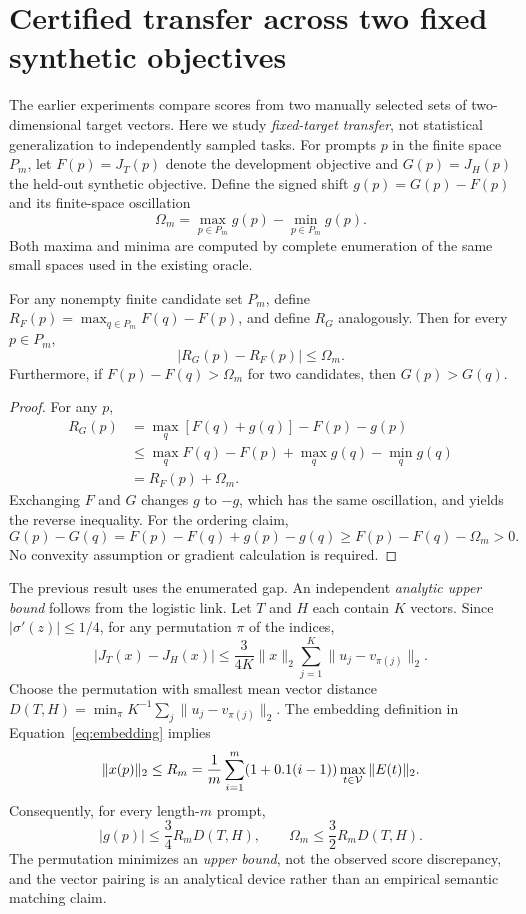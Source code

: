 \section{Certified transfer across two fixed synthetic objectives}
\label{sec:target-transfer}
The earlier experiments compare scores from two manually selected sets of
two-dimensional target vectors. Here we study \emph{fixed-target transfer},
not statistical generalization to independently sampled tasks. For
prompts $p$ in the finite space $P_m$, let $F(p)=J_T(p)$ denote the
development objective and $G(p)=J_H(p)$ the held-out synthetic objective.
Define the signed shift $g(p)=G(p)-F(p)$ and its finite-space oscillation
\[
\Omega_m=\max_{p\in P_m}g(p)-\min_{p\in P_m}g(p).
\]
Both maxima and minima are computed by complete enumeration of the same
small spaces used in the existing oracle.

\begin{proposition}
\label{prop:target-transfer}
For any nonempty finite candidate set $P_m$, define
$R_F(p)=\max_{q\in P_m}F(q)-F(p)$, and define $R_G$ analogously.
Then for every $p\in P_m$,
\begin{equation}
 |R_G(p)-R_F(p)|\leq\Omega_m.
 \label{eq:regret-transfer}
\end{equation}
Furthermore, if $F(p)-F(q)>\Omega_m$ for two candidates, then $G(p)>G(q)$.
\end{proposition}
\begin{proof}
For any $p$,
\[
\begin{split}
R_G(p)
 &=\max_q[F(q)+g(q)]-F(p)-g(p)\\
 &\leq \max_qF(q)-F(p)+\max_qg(q)-\min_qg(q)\\
 &= R_F(p)+\Omega_m.
\end{split}
\]
Exchanging $F$ and $G$ changes $g$ to $-g$, which has the same
oscillation, and yields the reverse inequality. For the ordering claim,
\[
 G(p)-G(q)
 =F(p)-F(q)+g(p)-g(q)
 \geq F(p)-F(q)-\Omega_m>0.
\]
No convexity assumption or gradient calculation is required.
\end{proof}

The previous result uses the enumerated gap. An independent
\emph{analytic upper bound} follows from the logistic link. Let $T$
and $H$ each contain $K$ vectors. Since
$|\sigma'(z)|\leq1/4$, for any permutation $\pi$ of the indices,
\[
 |J_T(x)-J_H(x)|
 \leq\frac{3}{4K}\|x\|_2
       \sum_{j=1}^K\|u_j-v_{\pi(j)}\|_2.
\]
Choose the permutation with smallest mean vector distance
$D(T,H)=\min_\pi K^{-1}\sum_j\|u_j-v_{\pi(j)}\|_2$.
The embedding definition in Equation~\eqref{eq:embedding} implies
\[
 \|x(p)\|_2\leq
 R_m=\frac{1}{m}\sum_{i=1}^m(1+0.1(i-1))
                  \max_{t\in\mathcal V}\|E(t)\|_2.
\]
Consequently, for every length-$m$ prompt,
\begin{equation}
 |g(p)|\leq\frac34R_mD(T,H),\qquad
 \Omega_m\leq\frac32R_mD(T,H).
 \label{eq:target-shift-analytic}
\end{equation}
The permutation minimizes an \emph{upper bound}, not the observed score
discrepancy, and the vector pairing is an analytical device rather than
an empirical semantic matching claim.

